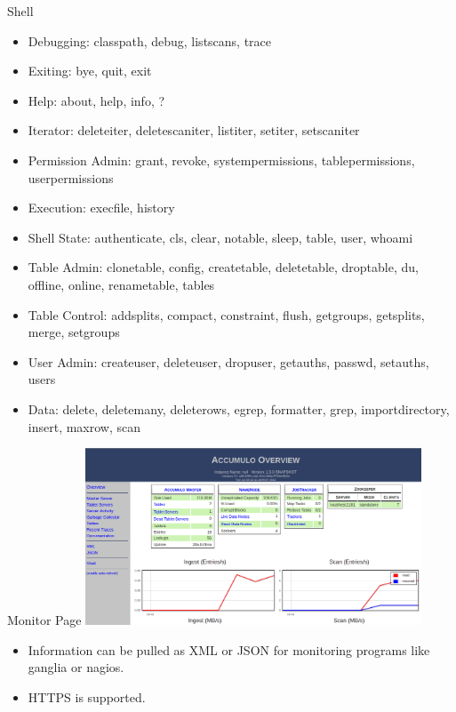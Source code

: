 \documentclass[t,landscape]{beamer}
\begin{document}
\begin{frame}{Shell}
\begin{itemize}
  \scriptsize
  \item{Debugging: classpath, debug, listscans, trace}
  \item{Exiting: bye, quit, exit}
  \item{Help: about, help, info, ?}
  \item{Iterator: deleteiter, deletescaniter, listiter, setiter, setscaniter}
  \item{Permission Admin: grant, revoke, systempermissions, tablepermissions, userpermissions}
  \item{Execution: execfile, history}
  \item{Shell State: authenticate, cls, clear, notable, sleep, table, user, whoami}
  \item{Table Admin: clonetable, config, createtable, deletetable, droptable, du, offline, online, renametable, tables}
  \item{Table Control: addsplits, compact, constraint, flush, getgroups, getsplits, merge, setgroups}
  \item{User Admin: createuser, deleteuser, dropuser, getauths, passwd, setauths, users}
  \item{Data: delete, deletemany, deleterows, egrep, formatter, grep, importdirectory, insert, maxrow, scan}
\end{itemize}
\end{frame}

\begin{frame}{Monitor Page}
\includegraphics[width=0.75\textwidth]{images/accumulo_monitor_page.png}
\begin{itemize}
\item{Information can be pulled as XML or JSON for monitoring programs like ganglia or nagios.}
\item{HTTPS is supported.}
\end{itemize}
\end{frame}
\end{document}

